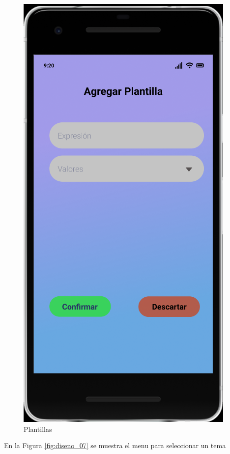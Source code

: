 \documentclass{article}
\begin{document}
\begin{figure}[H]
    \centering
    \includegraphics[scale=0.8]{imgs/Figma/Plantilla}
    \caption{Plantillas}
    \label{fig:diseno_06}
\end{figure}

En la Figura \ref{fig:diseno_07} se muestra el menu para seleccionar un tema 
\end{document}
